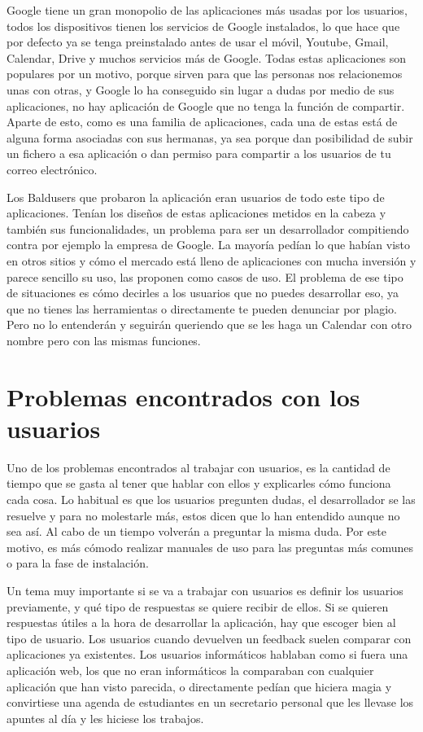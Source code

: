 Google tiene un gran monopolio de las aplicaciones más usadas por los usuarios, todos los dispositivos tienen los servicios de Google instalados, lo que hace que por defecto ya se tenga preinstalado antes de usar el móvil, Youtube, Gmail, Calendar, Drive y muchos servicios más de Google.
Todas estas aplicaciones son populares por un motivo, porque sirven para que las personas nos relacionemos unas con otras, y Google lo ha conseguido sin lugar a dudas por medio de sus aplicaciones, no hay aplicación de Google que no tenga la función de compartir.
Aparte de esto, como es una familia de aplicaciones, cada una de estas está de alguna forma asociadas con sus hermanas, ya sea porque dan posibilidad de subir un fichero a esa aplicación o dan permiso para compartir a los usuarios de tu correo electrónico.

Los Baldusers que probaron la aplicación eran usuarios de todo este tipo de aplicaciones. Tenían los diseños de estas aplicaciones metidos en la cabeza y también sus funcionalidades, un problema para ser un desarrollador compitiendo contra por ejemplo la empresa de Google.
La mayoría pedían lo que habían visto en otros sitios y cómo el mercado está lleno de aplicaciones con mucha inversión y parece sencillo su uso, las proponen como casos de uso. 
El problema de ese tipo de situaciones es cómo decirles a los usuarios que no puedes desarrollar eso, ya que no tienes las herramientas o directamente te pueden denunciar por plagio.
Pero no lo entenderán y seguirán queriendo que se les haga un Calendar con otro nombre pero con las mismas funciones.


\section{Problemas encontrados con los usuarios}
\label{secc:problemas encontrados con los usuarios}

Uno de los problemas encontrados al trabajar con usuarios, es la cantidad de tiempo que se gasta al tener que hablar con ellos y explicarles cómo funciona cada cosa.
Lo habitual es que los usuarios pregunten dudas, el desarrollador se las resuelve y para no molestarle más, estos dicen que lo han entendido aunque no sea así. Al cabo de un tiempo volverán a preguntar la misma duda. Por este motivo, es más cómodo  realizar manuales de uso para las preguntas más comunes o para la fase de instalación.

Un tema muy importante si se va a trabajar con usuarios es definir los usuarios previamente, y qué tipo de respuestas se quiere recibir de ellos. Si se quieren respuestas útiles a la hora de desarrollar la aplicación, hay que escoger bien al tipo de usuario.
Los usuarios cuando devuelven un feedback suelen comparar con aplicaciones ya existentes.
Los usuarios informáticos hablaban como si fuera una aplicación web, los que no eran informáticos la comparaban con cualquier aplicación que han visto parecida, o directamente pedían que hiciera magia y convirtiese  una agenda de estudiantes en un secretario personal que les llevase los apuntes al día y les hiciese los trabajos.

